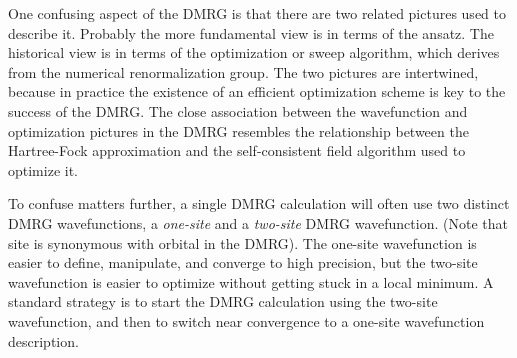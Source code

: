 \documentclass[letterpaper,12pt,aps, pra]{revtex4-1}
\begin{document}
One confusing aspect of the DMRG is that there are two related
pictures used to describe it. Probably the more fundamental view is in
terms of the ansatz.
The historical view is in terms of the optimization or sweep algorithm,
 which derives from the numerical renormalization group.
The two pictures are intertwined, because
in practice the existence of an efficient optimization scheme is
key to the success of the DMRG. The close association between the wavefunction and optimization pictures in the DMRG
resembles the relationship between the Hartree-Fock approximation and the
self-consistent field algorithm used to optimize it.

To confuse matters further, a single DMRG calculation will often use two distinct DMRG wavefunctions, a {\it one-site} and a {\it two-site}
DMRG wavefunction. (Note that site is synonymous with orbital in the DMRG). The one-site
 wavefunction is easier to define, manipulate, and converge to high precision, but the two-site wavefunction is
easier to optimize without getting stuck in a local minimum. A standard strategy is 
to start the DMRG calculation using the two-site wavefunction, and then to switch near convergence to a 
one-site wavefunction description.


\end{document}
